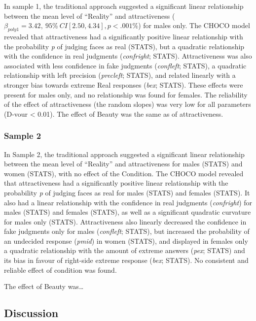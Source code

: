 \documentclass[
  jou,
  floatsintext,
  longtable,
  nolmodern,
  notxfonts,
  notimes,
  colorlinks=true,linkcolor=blue,citecolor=blue,urlcolor=blue]{apa7}
\begin{document}
In sample 1, the traditional approach suggested a significant linear
relationship between the mean level of ``Reality'' and attractiveness
(\(\beta_{poly1}=3.42, ~95\%~CI [2.50, 4.34], p < .001\%\)) for males
only. The CHOCO model revealed that attractiveness had a significantly
positive linear relationship with the probability \emph{p} of judging
faces as real (STATS), but a quadratic relationship with the confidence
in real judgments (\emph{confright}; STATS). Attractiveness was also
associated with less confidence in fake judgments (\emph{confleft};
STATS), a quadratic relationship with left precision (\emph{precleft};
STATS), and related linearly with a stronger bias towards extreme Real
responses (\emph{bex}; STATS). These effects were present for males
only, and no relationship was found for females. The reliability of the
effect of attractiveness (the random slopes) was very low for all
parameters (D-vour \textless{} 0.01). The effect of Beauty was the same
as of attractiveness.

\subsubsection{Sample 2}\label{sample-2}

In Sample 2, the traditional approach suggested a significant linear
relationship between the mean level of ``Reality'' and attractiveness
for males (STATS) and women (STATS), with no effect of the Condition.
The CHOCO model revealed that attractiveness had a significantly
positive linear relationship with the probability \emph{p} of judging
faces as real for males (STATS) and females (STATS). It also had a
linear relationship with the confidence in real judgments
(\emph{confright}) for males (STATS) and females (STATS), as well as a
significant quadratic curvature for males only (STATS). Attractiveness
also linearly decreased the confidence in fake judgments only for males
(\emph{confleft}; STATS), but increased the probability of an undecided
response (\emph{pmid}) in women (STATS), and displayed in females only a
quadratic relationship with the amount of extreme answers (\emph{pex};
STATS) and its bias in favour of right-side extreme response
(\emph{bex}; STATS). No consistent and reliable effect of condition was
found.

The effect of Beauty was\ldots{}

\subsection{Discussion}\label{discussion-1}
\end{document}
